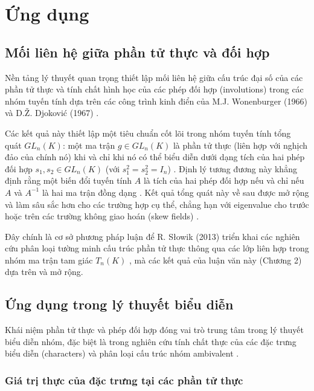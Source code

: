 \chapter{Ứng dụng}
\label{ch:applications}

\section{Mối liên hệ giữa phần tử thực và đối hợp}
\label{sec:involutions}

Nền tảng lý thuyết quan trọng thiết lập mối liên hệ giữa cấu trúc đại số của các phần tử thực và tính chất hình học của các phép đối hợp (involutions) trong các nhóm tuyến tính dựa trên các công trình kinh điển của M.J. Wonenburger (1966) \cite{Wonenburger1966} và D.Ž. Djoković (1967) \cite{Djokovic1967}.

Các kết quả này thiết lập một tiêu chuẩn cốt lõi trong nhóm tuyến tính tổng quát $GL_n(K)$: một ma trận $g \in GL_n(K)$ là phần tử thực (liên hợp với nghịch đảo của chính nó) khi và chỉ khi nó có thể biểu diễn dưới dạng tích của hai phép đối hợp $s_1, s_2 \in GL_n(K)$ (với $s_1^2 = s_2^2 = I_n$) \cite{Wonenburger1966,Djokovic1967}. Định lý tương đương này khẳng định rằng một biến đổi tuyến tính $A$ là tích của hai phép đối hợp nếu và chỉ nếu $A$ và $A^{-1}$ là hai ma trận đồng dạng \cite{Djokovic1967}. Kết quả tổng quát này về sau được mở rộng và làm sâu sắc hơn cho các trường hợp cụ thể, chẳng hạn với eigenvalue cho trước \cite{Furtado2008} hoặc trên các trường không giao hoán (skew fields) \cite{Ellers1979}.

Đây chính là cơ sở phương pháp luận để R. Słowik (2013) triển khai các nghiên cứu phân loại tường minh cấu trúc phần tử thực thông qua các lớp liên hợp trong nhóm ma trận tam giác $T_n(K)$ \cite{Slowik2013}, mà các kết quả của luận văn này (Chương 2) dựa trên và mở rộng.

\section{Ứng dụng trong lý thuyết biểu diễn}
\label{sec:rep-theory}

Khái niệm phần tử thực và phép đối hợp đóng vai trò trung tâm trong lý thuyết biểu diễn nhóm, đặc biệt là trong nghiên cứu tính chất thực của các đặc trưng biểu diễn (characters) và phân loại cấu trúc nhóm ambivalent \cite{JamesLiebeck2001,Armeanu1996}.

\subsection{Giá trị thực của đặc trưng tại các phần tử thực}

